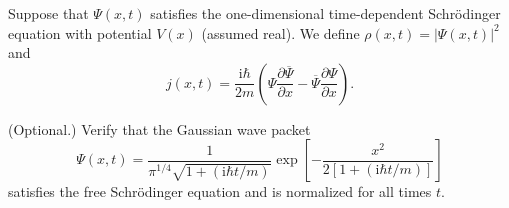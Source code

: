 \documentclass[answers]{exam}
\begin{document}
\begin{questions}
\question%
Suppose that $\Psi(x, t)$ satisfies the one-dimensional time-dependent Schrödinger equation with potential $V(x)$ (assumed real). We define $\rho(x, t)=|\Psi(x, t)|^{2}$ and \[
	j(x, t)=\frac{\mathrm{i} \hbar}{2 m}\left(\Psi \frac{\partial \overline{\Psi}}{\partial x}-\overline{\Psi} \frac{\partial \Psi}{\partial x}\right).
\]



\question%
(Optional.) Verify that the Gaussian wave packet \[
	\Psi(x, t)=\frac{1}{\pi^{1 / 4} \sqrt{1+(\mathrm{i} \hbar t / m)}} \exp \left[-\frac{x^{2}}{2[1+(\mathrm{i} \hbar t / m)]}\right]
\] satisfies the free Schrödinger equation and is normalized for all times $t$.

\end{questions}
\end{document}
